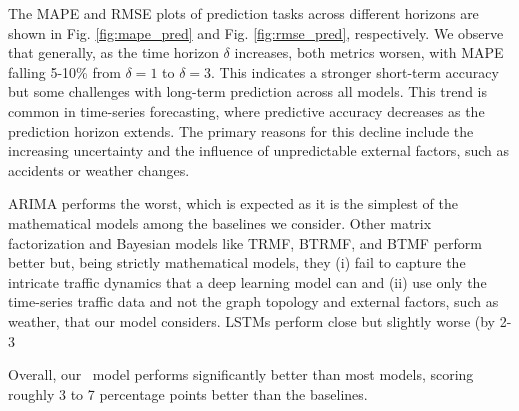 The MAPE and RMSE plots of prediction tasks across different horizons are shown in Fig. \ref{fig:mape_pred} and Fig. \ref{fig:rmse_pred}, respectively. We observe that generally, as the time horizon \(\delta\) increases, both metrics worsen, with MAPE falling 5-10\% from \(\delta=1\) to \(\delta=3\). This indicates a stronger short-term accuracy but some challenges with long-term prediction across all models. This trend is common in time-series forecasting, where predictive accuracy decreases as the prediction horizon extends. The primary reasons for this decline include the increasing uncertainty and the influence of unpredictable external factors, such as accidents or weather changes.

ARIMA performs the worst, which is expected as it is the simplest of the mathematical models among the baselines we consider. Other matrix factorization and Bayesian models like TRMF, BTRMF, and BTMF perform better but, being strictly mathematical models, they (i) fail to capture the intricate traffic dynamics that a deep learning model can and (ii) use only the time-series traffic data and not the graph topology and external factors, such as weather, that our model considers. LSTMs perform close but slightly worse (by 2-3%

Overall, our \name\ model performs significantly better than most models, scoring roughly 3 to 7 percentage points better than the baselines.

